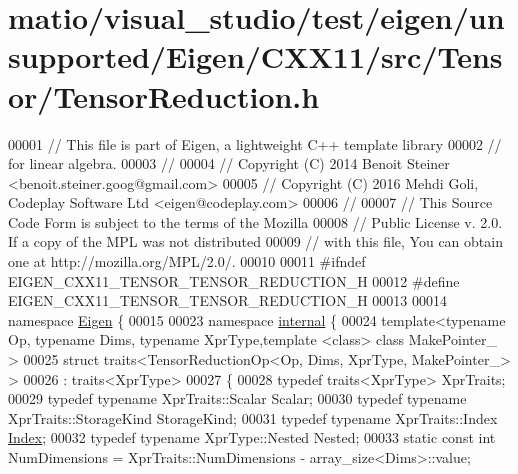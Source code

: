 \hypertarget{matio_2visual__studio_2test_2eigen_2unsupported_2_eigen_2_c_x_x11_2src_2_tensor_2_tensor_reduction_8h_source}{}\section{matio/visual\+\_\+studio/test/eigen/unsupported/\+Eigen/\+C\+X\+X11/src/\+Tensor/\+Tensor\+Reduction.h}
\label{matio_2visual__studio_2test_2eigen_2unsupported_2_eigen_2_c_x_x11_2src_2_tensor_2_tensor_reduction_8h_source}

\begin{DoxyCode}
00001 \textcolor{comment}{// This file is part of Eigen, a lightweight C++ template library}
00002 \textcolor{comment}{// for linear algebra.}
00003 \textcolor{comment}{//}
00004 \textcolor{comment}{// Copyright (C) 2014 Benoit Steiner <benoit.steiner.goog@gmail.com>}
00005 \textcolor{comment}{// Copyright (C) 2016 Mehdi Goli, Codeplay Software Ltd <eigen@codeplay.com>}
00006 \textcolor{comment}{//}
00007 \textcolor{comment}{// This Source Code Form is subject to the terms of the Mozilla}
00008 \textcolor{comment}{// Public License v. 2.0. If a copy of the MPL was not distributed}
00009 \textcolor{comment}{// with this file, You can obtain one at http://mozilla.org/MPL/2.0/.}
00010 
00011 \textcolor{preprocessor}{#ifndef EIGEN\_CXX11\_TENSOR\_TENSOR\_REDUCTION\_H}
00012 \textcolor{preprocessor}{#define EIGEN\_CXX11\_TENSOR\_TENSOR\_REDUCTION\_H}
00013 
00014 \textcolor{keyword}{namespace }\hyperlink{namespace_eigen}{Eigen} \{
00015 
00023 \textcolor{keyword}{namespace }\hyperlink{namespaceinternal}{internal} \{
00024   \textcolor{keyword}{template}<\textcolor{keyword}{typename} Op, \textcolor{keyword}{typename} Dims, \textcolor{keyword}{typename} XprType,\textcolor{keyword}{template} <\textcolor{keyword}{class}> \textcolor{keyword}{class }MakePointer\_ >
00025   \textcolor{keyword}{struct }traits<TensorReductionOp<Op, Dims, XprType, MakePointer\_> >
00026  : traits<XprType>
00027 \{
00028   \textcolor{keyword}{typedef} traits<XprType> XprTraits;
00029   \textcolor{keyword}{typedef} \textcolor{keyword}{typename} XprTraits::Scalar Scalar;
00030   \textcolor{keyword}{typedef} \textcolor{keyword}{typename} XprTraits::StorageKind StorageKind;
00031   \textcolor{keyword}{typedef} \textcolor{keyword}{typename} XprTraits::Index \hyperlink{namespace_eigen_a62e77e0933482dafde8fe197d9a2cfde}{Index};
00032   \textcolor{keyword}{typedef} \textcolor{keyword}{typename} XprType::Nested Nested;
00033   \textcolor{keyword}{static} \textcolor{keyword}{const} \textcolor{keywordtype}{int} NumDimensions = XprTraits::NumDimensions - array\_size<Dims>::value;

\end{DoxyCode}
